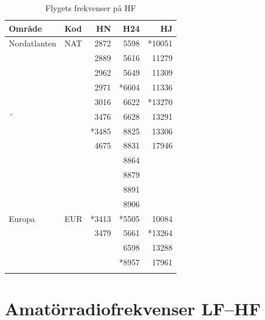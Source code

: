 {\begin{table}[H]
\centering
\begin{tabular}{llrrr}
	\textbf{Område} & \textbf{Kod} & \textbf{HN} & \textbf{H24} & \textbf{HJ} \\ \hline
	Nordatlanten    & NAT          &        2872 &         5598 &      *10051 \\
	                &              &        2889 &         5616 &       11279 \\
	                &              &        2962 &         5649 &       11309 \\
	                &              &        2971 &        *6604 &       11336 \\
	                &              &        3016 &         6622 &      *13270 \\
	´               &              &        3476 &         6628 &       13291 \\
	                &              &       *3485 &         8825 &       13306 \\
	                &              &        4675 &         8831 &       17946 \\
	                &              &             &         8864 &             \\
	                &              &             &         8879 &             \\
	                &              &             &         8891 &             \\
	                &              &             &         8906 &             \\ \hline
	Europa          & EUR          &       *3413 &        *5505 &       10084 \\
	                &              &        3479 &         5661 &      *13264 \\
	                &              &             &         6598 &       13288 \\
	                &              &             &        *8957 &       17961 \\ \hline
	                &              &             &              &
\end{tabular}
\caption{Flygets frekvenser på HF}
\end{table}

\section{Amatörradiofrekvenser LF--HF}

}
